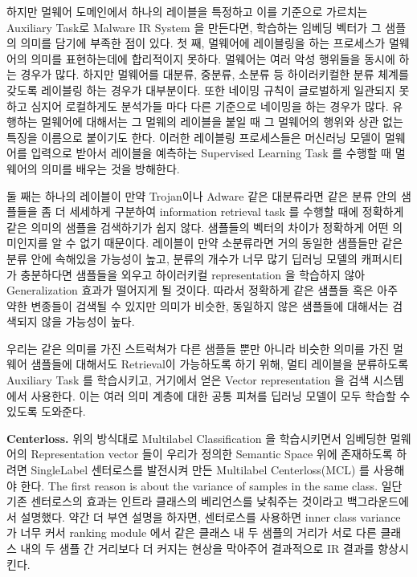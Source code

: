 하지만 멀웨어 도메인에서 하나의 레이블을 특정하고 이를 기준으로 가르치는 Auxiliary Task로 Malware IR System 을 만든다면, 학습하는 임베딩 벡터가 그 샘플의 의미를 담기에 부족한 점이 있다. 첫 째, 멀웨어에 레이블링을 하는 프로세스가 멀웨어의 의미를 표현하는데에 합리적이지 못하다. 멀웨어는 여러 악성 행위들을 동시에 하는 경우가 많다. 하지만 멀웨어를 대분류, 중분류, 소분류 등 하이러키컬한 분류 체계를 갖도록 레이블링 하는 경우가 대부분이다. 또한 네이밍 규칙이 글로벌하게 일관되지 못하고 심지어 로컬하게도 분석가들 마다 다른 기준으로 네이밍을 하는 경우가 많다. 유행하는 멀웨어에 대해서는 그 멀웨의 레이블을 붙일 때 그 멀웨어의 행위와 상관 없는 특징을 이름으로 붙이기도 한다. 이러한 레이블링 프로세스들은 머신러닝 모델이 멀웨어를 입력으로 받아서 레이블을 예측하는 Supervised Learning Task 를 수행할 때 멀웨어의 의미를 배우는 것을 방해한다. 

둘 째는 하나의 레이블이 만약 Trojan이나 Adware 같은 대분류라면 같은 분류 안의 샘플들을 좀 더 세세하게 구분하여 information retrieval task 를 수행할 때에 정확하게 같은 의미의 샘플을 검색하기가 쉽지 않다. 샘플들의 벡터의 차이가 정확하게 어떤 의미인지를 알 수 없기 때문이다. 레이블이 만약 소분류라면 거의 동일한 샘플들만 같은 분류 안에 속해있을 가능성이 높고, 분류의 개수가 너무 많기 딥러닝 모델의 캐퍼시티가 충분하다면 샘플들을 외우고 하이러키컬 representation 을 학습하지 않아 Generalization 효과가 떨어지게 될 것이다. 따라서 정확하게 같은 샘플들 혹은 아주 약한 변종들이 검색될 수 있지만 의미가 비슷한, 동일하지 않은 샘플들에 대해서는 검색되지 않을 가능성이 높다. 

우리는 같은 의미를 가진 스트럭쳐가 다른 샘플들 뿐만 아니라 비슷한 의미를 가진 멀웨어 샘플들에 대해서도 Retrieval이 가능하도록 하기 위해, 멀티 레이블을 분류하도록 Auxiliary Task 를 학습시키고, 거기에서 얻은 Vector representation 을 검색 시스템에서 사용한다. 이는 여러 의미 계층에 대한 공통 피쳐를 딥러닝 모델이 모두 학습할 수 있도록 도와준다. 


\textbf{Centerloss. }
위의 방식대로 Multilabel Classification 을 학습시키면서 임베딩한 멀웨어의 Representation vector 들이 우리가 정의한 Semantic Space 위에 존재하도록 하려면 SingleLabel 센터로스를 발전시켜 만든 Multilabel Centerloss(MCL) 를 사용해야 한다. 
The first reason is about the variance of samples in the same class. 일단 기존 센터로스의 효과는 인트라 클래스의 베리언스를 낮춰주는 것이라고 백그라운드에서 설명했다. 약간 더 부연 설명을 하자면, 센터로스를 사용하면 inner class variance 가 너무 커서 ranking module 에서 같은 클래스 내 두 샘플의 거리가 서로 다른 클래스 내의 두 샘플 간 거리보다 더 커지는 현상을 막아주어 결과적으로 IR 결과를 향상시킨다. 

